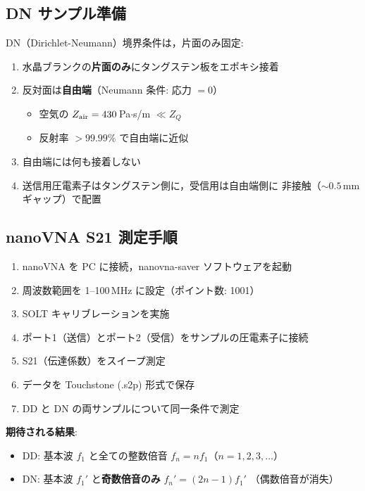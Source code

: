 \documentclass[11pt,a4paper]{article}
\begin{document}
\subsection{DN サンプル準備}

DN（Dirichlet-Neumann）境界条件は，片面のみ固定:

\begin{enumerate}
\item 水晶ブランクの\textbf{片面のみ}にタングステン板をエポキシ接着
\item 反対面は\textbf{自由端}（Neumann 条件: 応力 $= 0$）
  \begin{itemize}
  \item 空気の $Z_{\rm air} = 430$\,Pa$\cdot$s/m $\ll Z_Q$
  \item 反射率 $> 99.99\%$ で自由端に近似
  \end{itemize}
\item 自由端には何も接着しない
\item 送信用圧電素子はタングステン側に，受信用は自由端側に
  非接触（$\sim 0.5$\,mm ギャップ）で配置
\end{enumerate}

\subsection{nanoVNA S21 測定手順}

\begin{enumerate}
\item nanoVNA を PC に接続，nanovna-saver ソフトウェアを起動
\item 周波数範囲を 1--100\,MHz に設定（ポイント数: 1001）
\item SOLT キャリブレーションを実施
\item ポート1（送信）とポート2（受信）をサンプルの圧電素子に接続
\item S21（伝達係数）をスイープ測定
\item データを Touchstone (.s2p) 形式で保存
\item DD と DN の両サンプルについて同一条件で測定
\end{enumerate}

\textbf{期待される結果}:
\begin{itemize}
\item DD: 基本波 $f_1$ と全ての整数倍音 $f_n = n f_1$（$n = 1, 2, 3, \ldots$）
\item DN: 基本波 $f_1'$ と\textbf{奇数倍音のみ} $f_n' = (2n-1) f_1'$
  （偶数倍音が消失）
\end{itemize}
\end{document}
